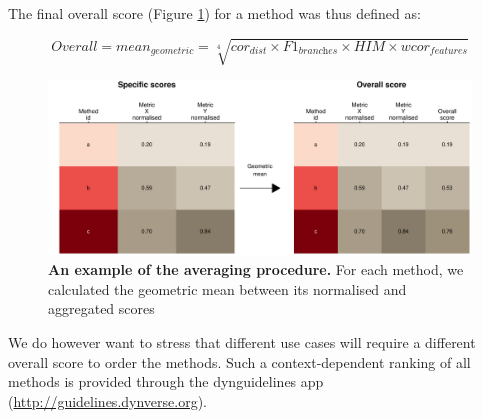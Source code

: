 The final overall score (Figure \ref{fig:snote1fig_14}) for a method was thus defined as: 

$$\textit{Overall} = \textit{mean}_{\textit{geometric}} = \sqrt[4]{\textit{cor}_{\textit{dist}} \times \textit{F1}_{\textit{branches}} \times \textit{HIM} \times \textit{wcor}_{\textit{features}}}$$

\begin{figure}
	\centering\includegraphics[width=0.8\linewidth]{fig/dynbenchmark/snote1fig_14.pdf}
	\caption{
		\textbf{An example of the averaging procedure.} 
		For each method, we calculated the geometric mean between its normalised and aggregated scores
	}
	\label{fig:snote1fig_14}
\end{figure}

We do however want to stress that different use cases will require a different overall score to order the methods. Such a context-dependent ranking of all methods is provided through the dynguidelines app (\href{http://guidelines.dynverse.org}{http://guidelines.dynverse.org}).
